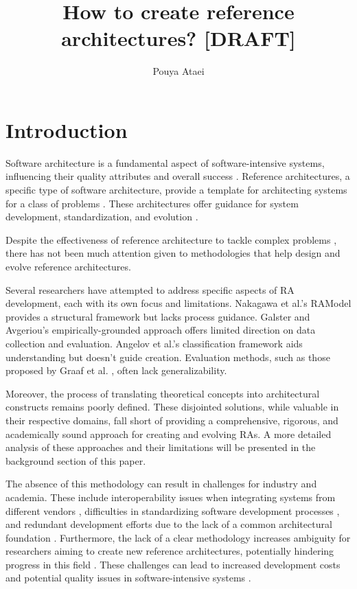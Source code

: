 \documentclass[12pt,a4paper]{article}
\title{How to create reference architectures? [DRAFT]}
\author{Pouya Ataei}
\date{}
\begin{document}
\maketitle

\section{Introduction}

Software architecture is a fundamental aspect of software-intensive systems, influencing their quality attributes and overall success \cite{bass2012software}. Reference architectures, a specific type of software architecture, provide a template for architecting systems for a class of problems \cite{angelov2012framework}. These architectures offer guidance for system development, standardization, and evolution \cite{cloutier2010concept}.


Despite the effectiveness of reference architecture to tackle complex problems \cite{angelov2012designing}, there has not been much attention given to methodologies that help design and evolve reference architectures. 

Several researchers have attempted to address specific aspects of RA development, each with its own focus and limitations. Nakagawa et al.'s RAModel \cite{nakagawa2011ramodel} provides a structural framework but lacks process guidance. Galster and Avgeriou's empirically-grounded approach \cite{galster2011empirically} offers limited direction on data collection and evaluation. Angelov et al.'s classification framework \cite{angelov2012framework} aids understanding but doesn't guide creation. Evaluation methods, such as those proposed by Graaf et al. \cite{graaf2005evaluating}, often lack generalizability. 

Moreover, the process of translating theoretical concepts into architectural constructs remains poorly defined. These disjointed solutions, while valuable in their respective domains, fall short of providing a comprehensive, rigorous, and academically sound approach for creating and evolving RAs. A more detailed analysis of these approaches and their limitations will be presented in the background section of this paper.




The absence of this methodology can result in challenges for industry and academia. These include interoperability issues when integrating systems from different vendors \cite{weyrich2015reference}, difficulties in standardizing software development processes \cite{garciamoreno2020microservices}, and redundant development efforts due to the lack of a common architectural foundation \cite{nakagawa2011aspect}. Furthermore, the lack of a clear methodology increases ambiguity for researchers aiming to create new reference architectures, potentially hindering progress in this field \cite{Angelov2012}. These challenges can lead to increased development costs and potential quality issues in software-intensive systems \cite{antinyan2020revealing}.
\end{document}
